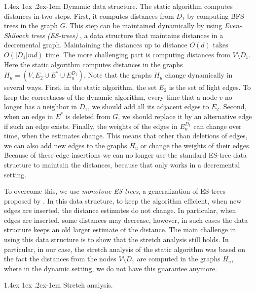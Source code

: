 \documentclass[11pt]{article}
\makeatletter
\theoremstyle{definition}
\theoremstyle{remark}
\renewcommand{\paragraph}{%
  \@startsection{paragraph}{4}%
  {\z@}{1.4ex \@plus 1ex \@minus .2ex}{-1em}%
  {\normalfont\normalsize\bfseries}%
}
\makeatother
\begin{document}
\paragraph{Dynamic data structure.} 
The static algorithm computes distances in two steps. First, it computes distances from $D_1$ by computing BFS trees in the graph $G$. This step can be maintained dynamically by using \emph{Even-Shiloach trees (ES-trees)} \cite{ES81}, a data structure that maintains distances in a decremental graph. Maintaining the distances up to distance $O(d)$ takes $O(|D_1|md)$ time.
The more challenging part is computing distances from $V \setminus D_1$. Here the static algorithm computes distances in the graphs $H_u=(V, E_2 \cup E^* \cup E^{D_1}_u)$. Note that the graphs $H_u$ change dynamically in several ways. First, in the static algorithm, the set $E_2$ is the set of light edges. To keep the correctness of the dynamic algorithm, every time that a node $v$ no longer has a neighbor in $D_1$, we should add all its adjacent edges to $E_2$. Second, when an edge in $E^*$ is deleted from $G$, we should replace it by an alternative edge if such an edge exists. Finally, the weights of the edges in $E^{D_1}_u$ can change over time, when the estimates change. This means that other than deletions of edges, we can also add new edges to the graphs $H_u$ or change the weights of their edges. Because of these edge insertions we can no longer use the standard ES-tree data structure to maintain the distances, because that only works in a decremental setting. 

To overcome this, we use \emph{monotone ES-trees}, a generalization of ES-trees proposed by \cite{HKN2016,HKN14}. In this data structure, to keep the algorithm efficient, when new edges are inserted, the distance estimates do not change. In particular, when edges are inserted, some distances may decrease, however, in such cases the data structure keeps an old larger estimate of the distance. The main challenge in using this data structure is to show that the stretch analysis still holds. In particular, in our case, the stretch analysis of the static algorithm was based on the fact the distances from the nodes $V \setminus D_1$ are computed in the graphs $H_u$, where in the dynamic setting, we do not have this guarantee anymore.  

\paragraph{Stretch analysis.}
\end{document}
